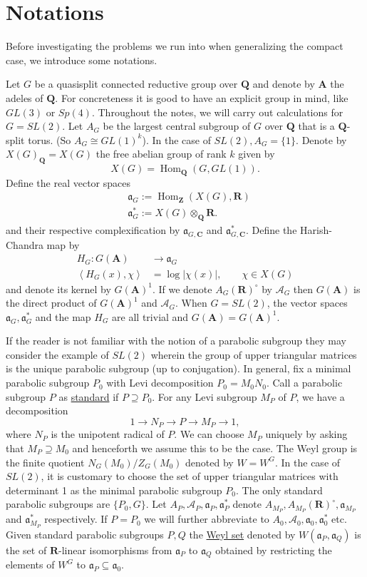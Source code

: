 \documentclass{ims9x6}
\def\A{\mathbf A}
\def\C{\mathbf C}
\def\Q{\mathbf Q}
\def\R{\mathbf R}
\def\Z{\mathbf Z}
\def\AAA{\mathcal A}	%
\def\aaa{\mathfrak a}
\def\hom{\operatorname{Hom}}
\def\mod#1{\lvert #1 \rvert} %
\def\sprod#1#2{\left\langle #1 , #2 \right\rangle}  %
\begin{document}
\section{Notations} \label{sec_not1}

Before investigating the problems we run into when generalizing the compact case, we introduce some notations. 

Let $G$ be a quasisplit connected reductive group over $\Q$ and denote by $\A$ the adeles of $\Q$. For concreteness it is good to have an explicit group in mind, like $GL(3)$ or $Sp(4)$. Throughout the notes, we will carry out calculations for $G = SL(2)$. Let $A_G$ be the largest central subgroup of $G$ over $\Q$ that is a $\Q$-split torus. (So $A_G \cong GL(1)^k$). In the case of $SL(2), A_G = \{1\}$. Denote by $X(G)_\Q = X(G)$ the free abelian group of rank $k$ given by
\[ X(G) = \hom_\Q(G, GL(1)). \]
Define the real vector spaces
\begin{align*}
	& \aaa_G := \hom_\Z(X(G), \R) \\
	& \aaa_G^* := X(G) \otimes_\Q \R.
\end{align*}
and their respective complexification by $\aaa_{G, \C}$ and $\aaa_{G, \C}^*$. 
Define the Harish-Chandra map by
\begin{align*}
	H_G : G(\A) & \to \aaa_G \\
	\sprod{H_G(x)}{\chi} & = \log \mod{\chi(x)}, \qquad \chi \in X(G)
\end{align*}
and denote its kernel by $G(\A)^1$. If we denote $A_G(\R)^\circ$ by $\AAA_G$ then $G(\A)$ is the direct product of $G(\A)^1$ and $\AAA_G$. When $G = SL(2)$, the vector spaces $\aaa_G, \aaa_G^*$ and the map $H_G$ are all trivial and $G(\A) = G(\A)^1$.

If the reader is not familiar with the notion of a parabolic subgroup they may consider the example of $SL(2)$ wherein the group of upper triangular matrices is the unique parabolic subgroup (up to conjugation). In general, fix a minimal parabolic subgroup $P_0$ with Levi decomposition $P_0 = M_0 N_0$. Call a parabolic subgroup $P$ as \underline{standard} if $P \supseteq P_0$. For any Levi subgroup $M_P$ of $P$, we have a decomposition
\[ 1 \to N_P \to P \to M_P \to 1, \]
where $N_P$ is the unipotent radical of $P$. We can choose $M_P$ uniquely by asking that \mbox{$M_P \supseteq M_0$} and henceforth we assume this to be the case. The Weyl group is the finite quotient $N_G(M_0)/Z_G(M_0)$ denoted by $W = W^G$. In the case of $SL(2)$, it is customary to choose the set of upper triangular matrices with determinant 1 as the minimal parabolic subgroup $P_0$. The only standard parabolic subgroups are $\{P_0, G\}$.
Let $A_P, \AAA_P, \aaa_P, \aaa_P^*$ denote $A_{M_P}, A_{M_P}(\R)^\circ, \aaa_{M_P}$ and $\aaa_{M_P}^*$ respectively. If $P = P_0$ we will further abbreviate to $A_0, \AAA_0, \aaa_0, \aaa_0^*$ etc. Given standard parabolic subgroups $P, Q$ the \underline{Weyl set} denoted by $W(\aaa_P, \aaa_Q)$ is the set of $\R$-linear isomorphisms from $\aaa_P$ to $\aaa_Q$ obtained by restricting the elements of $W^G$ to $\aaa_P \subseteq \aaa_0$. 
\end{document}
